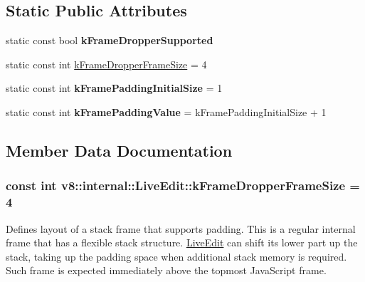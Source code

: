 \subsection*{Static Public Attributes}
\begin{DoxyCompactItemize}
\item 
\hypertarget{classv8_1_1internal_1_1_live_edit_a065987e52e8dd61f79875776a2ffe141}{}static const bool {\bfseries k\+Frame\+Dropper\+Supported}\label{classv8_1_1internal_1_1_live_edit_a065987e52e8dd61f79875776a2ffe141}

\item 
static const int \hyperlink{classv8_1_1internal_1_1_live_edit_ae7c4b85cb933c090d52eadc6b59d1ed6}{k\+Frame\+Dropper\+Frame\+Size} = 4
\item 
\hypertarget{classv8_1_1internal_1_1_live_edit_ac4c2e93e880c61cc4b7167211f3509db}{}static const int {\bfseries k\+Frame\+Padding\+Initial\+Size} = 1\label{classv8_1_1internal_1_1_live_edit_ac4c2e93e880c61cc4b7167211f3509db}

\item 
\hypertarget{classv8_1_1internal_1_1_live_edit_a0551d143d88b1c65cd64b294aafadc71}{}static const int {\bfseries k\+Frame\+Padding\+Value} = k\+Frame\+Padding\+Initial\+Size + 1\label{classv8_1_1internal_1_1_live_edit_a0551d143d88b1c65cd64b294aafadc71}

\end{DoxyCompactItemize}


\subsection{Member Data Documentation}
\hypertarget{classv8_1_1internal_1_1_live_edit_ae7c4b85cb933c090d52eadc6b59d1ed6}{}
\subsubsection[{k\+Frame\+Dropper\+Frame\+Size}]{\setlength{\rightskip}{0pt plus 5cm}const int v8\+::internal\+::\+Live\+Edit\+::k\+Frame\+Dropper\+Frame\+Size = 4\hspace{0.3cm}{\ttfamily [static]}}\label{classv8_1_1internal_1_1_live_edit_ae7c4b85cb933c090d52eadc6b59d1ed6}
Defines layout of a stack frame that supports padding. This is a regular internal frame that has a flexible stack structure. \hyperlink{classv8_1_1internal_1_1_live_edit}{Live\+Edit} can shift its lower part up the stack, taking up the \textquotesingle{}padding\textquotesingle{} space when additional stack memory is required. Such frame is expected immediately above the topmost Java\+Script frame.

